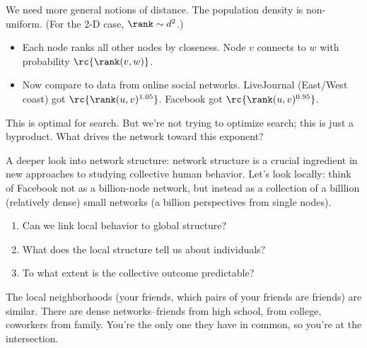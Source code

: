 We need more general notions of distance. The population density is non-uniform. (For the 2-D case, $\rank\sim d^2$.)
\begin{itemize}
\item
Each node ranks all other nodes by closeness. Node $v$ connects to $w$ with probability $\rc{\rank(v,w)}$.
\item Now compare to data from online social networks. LiveJournal (East/West coast) got $\rc{\rank(u,v)^{1.05}}$. Facebook got $\rc{\rank(u,v)^{0.95}}$.
\end{itemize}
This is optimal for search. But we're not trying to optimize search; this is just a byproduct. %
What drives the network toward this exponent?

A deeper look into network structure: network structure is a crucial ingredient in new approaches to studying collective human behavior. Let's look locally: think of Facebook not as a billion-node network, but instead as a collection of a billlion (relatively dense) small networks (a billion perspectives from single nodes).
\begin{enumerate}
\item
Can we link local behavior to global structure? 
\item
What does the local structure tell us about individuals? 
\item
To what extent is the collective outcome predictable?
\end{enumerate}
The local neighborhoods (your friends, which pairs of your friends are friends) are similar. There are dense networks--friends from high school, from college, coworkers from family. You're the only one they have in common, so you're at the intersection. 


